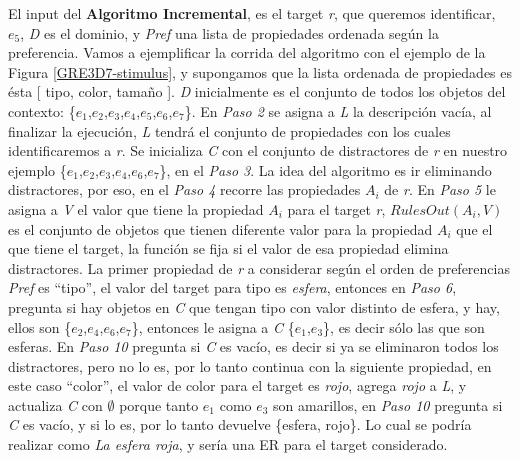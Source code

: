 
El input del {\bf Algoritmo Incremental}, es el target \emph{r}, que queremos identificar, $e_{5}$, \emph{D} es el dominio, y \emph{Pref} una lista de propiedades ordenada seg\'un la preferencia. Vamos a ejemplificar la corrida del algoritmo con el ejemplo de la Figura \ref{GRE3D7-stimulus}, y supongamos que la lista ordenada de propiedades es \'esta [ tipo, color, tama\~no ]. \emph{D} inicialmente es el conjunto de todos los objetos del contexto: \{$e_{1}$,$e_{2}$,$e_{3}$,$e_{4}$,$e_{5}$,$e_{6}$,$e_{7}$\}.
En {\it Paso 2} se asigna a \emph{L} la descripci\'on vac\'{i}a, al finalizar la ejecuci\'on, \emph{L} tendr\'a el conjunto de propiedades con los cuales identificaremos a \emph{r}. Se inicializa \emph{C} con el conjunto de distractores de \emph{r} en nuestro ejemplo \{$e_{1}$,$e_{2}$,$e_{3}$,$e_{4}$,$e_{6}$,$e_{7}$\}, en el {\it Paso 3}. 
La idea del algoritmo es ir eliminando distractores, por eso, en el {\it Paso 4} recorre las propiedades $A_{i}$ de \emph{r}. En {\it Paso 5} le asigna a \emph{V} el valor que tiene la propiedad $A_{i}$ para el target \emph{r}, $RulesOut(A_{i},V)$ es el conjunto de objetos que tienen diferente valor para la propiedad $A_{i}$ que el que tiene el  target, la funci\'on se fija si el valor de esa propiedad elimina distractores. La primer propiedad de \emph{r} a considerar seg\'un el orden de preferencias \emph{Pref} es ``tipo'', el valor del target para tipo es {\it esfera}, entonces en {\it Paso 6}, pregunta si hay objetos en \emph{C} que tengan tipo con valor distinto de esfera, y hay, ellos son \{$e_{2}$,$e_{4}$,$e_{6}$,$e_{7}$\}, entonces le asigna a \emph{C} \{$e_{1}$,$e_{3}$\}, es decir s\'olo las que son esferas. En {\it Paso 10} pregunta si \emph{C} es vac\'io, es decir si ya se eliminaron todos los distractores, pero no lo es, por lo tanto continua con la siguiente propiedad, en este caso ``color'', el valor de color para el target es {\it rojo}, agrega {\it rojo} a \emph{L}, y actualiza \emph{C} con $\emptyset$ porque tanto $e_{1}$ como $e_{3}$ son amarillos, en {\it Paso 10} pregunta si \emph{C} es vac\'io, y si lo es, por lo tanto devuelve \{esfera, rojo\}. Lo cual se podr\'ia realizar como {\it La esfera roja}, y ser\'ia una ER para el target considerado.


